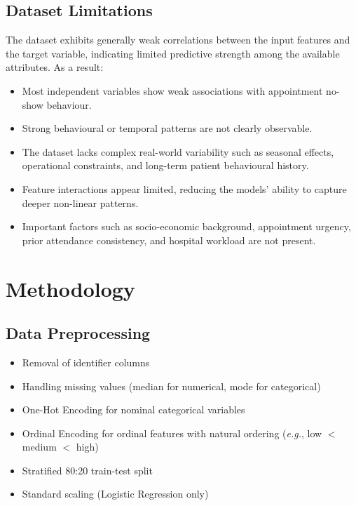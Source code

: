 \documentclass[12pt, a4paper]{report}
\begin{document}
\section{Dataset Limitations}

The dataset exhibits generally weak correlations between the input features and
the target variable, indicating limited predictive strength among the available
attributes. As a result:

\begin{itemize}
  \item Most independent variables show weak associations with appointment
        no-show behaviour.
  \item Strong behavioural or temporal patterns are not clearly observable.
  \item The dataset lacks complex real-world variability such as seasonal
        effects, operational constraints, and long-term patient behavioural
        history.
  \item Feature interactions appear limited, reducing the models' ability to
        capture deeper non-linear patterns.
  \item Important factors such as socio-economic background, appointment
        urgency, prior attendance consistency, and hospital workload are not
        present.
\end{itemize}

\chapter{Methodology}

\section{Data Preprocessing}

\begin{itemize}
  \item Removal of identifier columns
  \item Handling missing values (median for numerical, mode for categorical)
  \item One-Hot Encoding for nominal categorical variables
  \item Ordinal Encoding for ordinal features with natural ordering
        (\emph{e.g.}, low $<$ medium $<$ high)
  \item Stratified 80:20 train-test split
  \item Standard scaling (Logistic Regression only)
\end{itemize}
\end{document}
